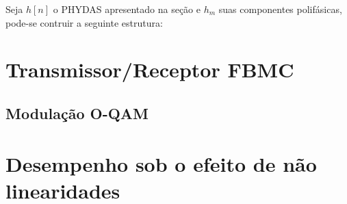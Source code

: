 \par Seja $h[n]$ o PHYDAS apresentado na seção \label{pulso} e $h_{m}$ suas componentes polifásicas, pode-se contruir a seguinte estrutura: 






\section{Transmissor/Receptor FBMC}
\subsection{Modulação O-QAM} 



\section{Desempenho sob o efeito de não linearidades }